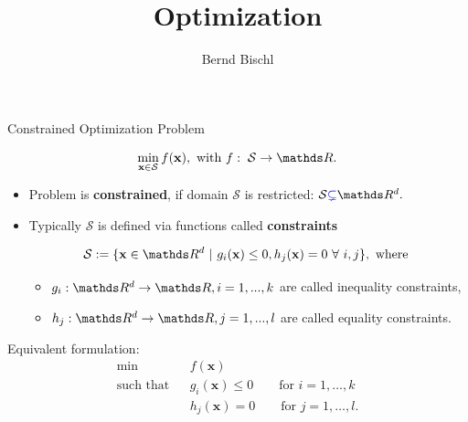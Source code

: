




\newcommand{\slvec}{\left(\zeta^{(1)}, \zeta^{(n)}\right)} %
\newcommand{\sli}[1][i]{\zeta^{(#1)}} %
\newcommand{\scptxi}{\scp{\thetab}{\xi}} %
\newcommand{\alphav}{\bm{\alpha}} %

\newcommand{\titlefigure}{figure_man/classes_optimization_problems.png}
\newcommand{\learninggoals}{
\item Definition
\item LP, QP, CP
\item Ridge and Lasso
\item Soft-margin SVM 
}



\title{Optimization}
\author{Bernd Bischl}
\date{}



\sloppy

\begin{vbframe}{Constrained Optimization Problem }

$$
\min_{\xv \in \mathcal{S}} \fx, \text{ with } f: \; \mathcal{S} \to \R.
$$

\begin{itemize}
	\item Problem is \textbf{constrained}, if domain $\mathcal{S}$ is restricted: $\mathcal{S} \textcolor{blue}{\subsetneq} \R^d.$

	\item Typically $\mathcal{S}$ is defined via functions called \textbf{constraints}

	$$
		\mathcal{S}:= \{\xv \in \R^d ~|~ g_i(\xv) \le 0, h_j(\xv) = 0 ~\forall~ i, j\}, \text{ where }
	$$ 

\begin{itemize}
\item $g_i: \R^d \to \R, i = 1, ..., k$ are called inequality constraints,
\item $h_j: \R^d \to \R, j = 1, ..., l$ are called equality constraints.
\end{itemize}

\end{itemize}

\lz 

Equivalent formulation: 
\begin{eqnarray*}
\min && f(\mathbf{x})  \\
\text{such that} && g_i(\mathbf{x}) \le 0 \qquad \text{for } i=1,\ldots,k  \\
 && h_j(\mathbf{x}) = 0 \qquad \text{for } j=1,\ldots,l. 
\end{eqnarray*}

\end{vbframe}


